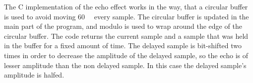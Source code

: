 The C implementation of the echo effect works in the way, that a circular buffer is used to avoid moving \SI{60}{\kilo \byte} every sample. The circular buffer is updated in the main part of the program, and modulo is used to wrap around the edge of the circular buffer. The code returns the current sample and a sample that was held in the buffer for a fixed amount of time. The delayed sample is bit-shifted two times in order to decrease the amplitude of the delayed sample, so the echo is of lesser amplitude than the non delayed sample. In this case the delayed sample's amplitude is halfed. 
